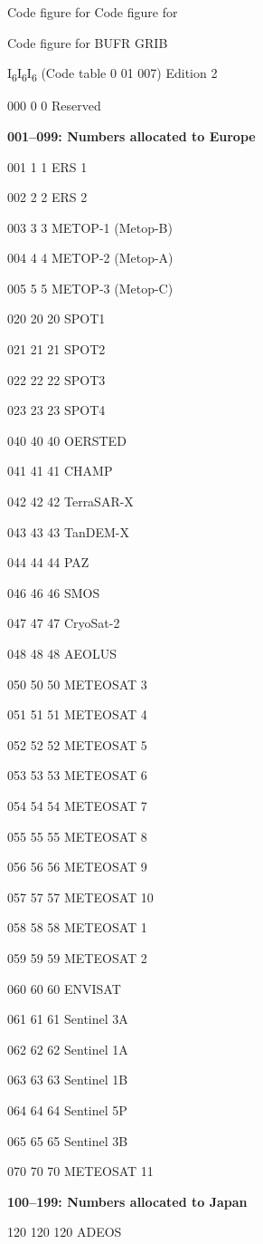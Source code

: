 Code figure for Code figure for

Code figure for BUFR GRIB

I\textsubscript{6}I\textsubscript{6}I\textsubscript{6} (Code table 0 01 007) Edition 2

000 0 0 Reserved

\textbf{001--099: Numbers allocated to Europe}

001 1 1 ERS 1

002 2 2 ERS 2

003 3 3 METOP-1 (Metop-B)

004 4 4 METOP-2 (Metop-A)

005 5 5 METOP-3 (Metop-C)

020 20 20 SPOT1

021 21 21 SPOT2

022 22 22 SPOT3

023 23 23 SPOT4

040 40 40 OERSTED

041 41 41 CHAMP

042 42 42 TerraSAR-X

043 43 43 TanDEM-X

044 44 44 PAZ

046 46 46 SMOS

047 47 47 CryoSat-2

048 48 48 AEOLUS

050 50 50 METEOSAT 3

051 51 51 METEOSAT 4

052 52 52 METEOSAT 5

053 53 53 METEOSAT 6

054 54 54 METEOSAT 7

055 55 55 METEOSAT 8

056 56 56 METEOSAT 9

057 57 57 METEOSAT 10

058 58 58 METEOSAT 1

059 59 59 METEOSAT 2

060 60 60 ENVISAT

061 61 61 Sentinel 3A

062 62 62 Sentinel 1A

063 63 63 Sentinel 1B

064 64 64 Sentinel 5P

065 65 65 Sentinel 3B

070 70 70 METEOSAT 11

\textbf{100--199: Numbers allocated to Japan}

120 120 120 ADEOS

